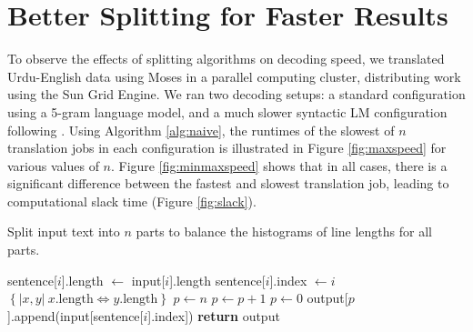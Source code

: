 \documentclass{pbml}
\begin{document}
\section{Better Splitting for Faster Results}


To observe the effects of splitting algorithms on decoding speed, we translated Urdu-English data using Moses in a parallel computing cluster, distributing work using the Sun Grid Engine. We ran two decoding setups: a standard configuration using a 5-gram language model, and a much slower syntactic LM configuration following \citet{schwartzetal11}. Using Algorithm \ref{alg:naive}, the runtimes of the slowest of $n$ translation jobs in each configuration is illustrated in Figure \ref{fig:maxspeed} for various values of $n$. Figure \ref{fig:minmaxspeed} shows that in all cases, there is a significant difference between the fastest and slowest translation job, leading to computational slack time (Figure \ref{fig:slack}).


\begin{algorithm}[!h]
\caption{Split input text into $n$ parts to balance the histograms of line lengths for all parts.}
\begin{algorithmic}
\State sentence[$i$].length $\gets$ input[$i$].length
\State sentence[$i$].index $\gets i$
\EndFor
\State {} $\left\{|x,y|\ x.\mbox{length}\Leftrightarrow y.\mbox{length}\right\}$ 
\State {}
\State $p \gets n$
\State $p \gets p+1$
\Else
\State $p \gets 0$
\EndIf
\State output[$p$].append(input[sentence[$i$].index])
\EndFor
\State \textbf{return} output
\EndFunction
\end{algorithmic}
\label{alg:histogram}
\end{algorithm}
\end{document}
